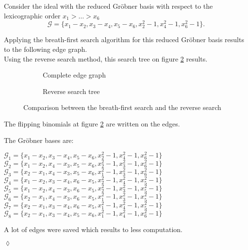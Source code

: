 \begin{env_example}\normalfont
Consider the ideal with the reduced Gröbner basis with respect to the lexicographic order $x_{1} > \ldots > x_{6} $
\[ \mathcal{G} = \{x_{1} - x_{2}, x_{3} - x_{4}, x_{5}-x_{6} , x_{2}^{2} -1 , x_{4}^{2} - 1, x_{6}^{2} - 1 \}. \]

Applying the breath-first search algorithm for this reduced Gröbner basis results to the following edge graph.\\
Using the reverse search method, this search tree on figure \ref{fig:reverse} results.


\begin{figure}[h]
    \centering
    \begin{subfigure}[b]{0.48\linewidth}        %
        \centering
        
        \caption{Complete edge graph}
        \label{fig:breadth}
    \end{subfigure}
    \begin{subfigure}[b]{0.48\linewidth}        %
        \centering
        
        \caption{Reverse search tree}
        \label{fig:reverse}
    \end{subfigure}
    \caption{Comparison between the breath-first search and the reverse search}
    \label{fig:graph}
\end{figure}
\newpage
The flipping binomials at figure \ref{fig:reverse} are written on the edges.

The Gröbner bases are:
\begin{center}
$\mathcal{G}_{1} = \{x_{1}-x_{2},x_{3}-x_{4},x_{5}-x_{6},x_{2}^{2}-1,x_{4}^{2}-1,x_{6}^{2}-1 \} $ \\
$\mathcal{G}_{2} = \{x_{1}-x_{2},x_{4}-x_{3},x_{5}-x_{6},x_{2}^{2}-1,x_{3}^{2}-1,x_{6}^{2}-1 \} $ \\
$\mathcal{G}_{3} = \{x_{2}-x_{1},x_{4}-x_{3},x_{5}-x_{6},x_{1}^{2}-1,x_{3}^{2}-1,x_{6}^{2}-1 \} $ \\
$\mathcal{G}_{4} = \{x_{1}-x_{2},x_{3}-x_{4},x_{6}-x_{5},x_{2}^{2}-1,x_{4}^{2}-1,x_{5}^{2}-1 \} $ \\
$\mathcal{G}_{5} = \{x_{1}-x_{2},x_{4}-x_{3},x_{6}-x_{5},x_{2}^{2}-1,x_{3}^{2}-1,x_{5}^{2}-1 \} $ \\
$\mathcal{G}_{6} = \{x_{2}-x_{1},x_{4}-x_{3},x_{6}-x_{5},x_{1}^{2}-1,x_{3}^{2}-1,x_{5}^{2}-1 \} $ \\
$\mathcal{G}_{7} = \{x_{2}-x_{1},x_{3}-x_{4},x_{6}-x_{5},x_{1}^{2}-1,x_{4}^{2}-1,x_{5}^{2}-1 \} $ \\
$\mathcal{G}_{8} = \{x_{2}-x_{1},x_{3}-x_{4},x_{5}-x_{6},x_{1}^{2}-1,x_{4}^{2}-1,x_{6}^{2}-1 \} $ \\
\end{center}

A lot of edges were saved which results to less computation.
\begin{flushright}
$\lozenge$
\end{flushright}
\end{env_example}




